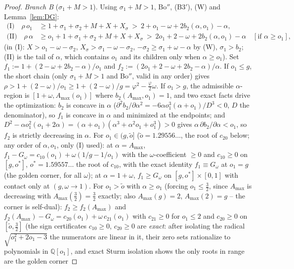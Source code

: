 \documentclass[11pt]{article}
\theoremstyle{definition}
\begin{document}
\begin{proof}
\emph{Branch B} ($\sigma_1+M>1$). Using $\sigma_1+M>1$, Bo$''$, (B3$'$),
(W) and Lemma~\ref{lem:DG}:
\begin{align*}
\text{(I)}\quad
\rho\,o_1&\ge1+\sigma_1+\sigma_2+M+X+X_\sigma
\ >\ 2+o_1-\omega+2b_2(\alpha,o_1)-\alpha,\\
\text{(II)}\quad
\rho\,\alpha&\ge o_1+1+\sigma_1+\sigma_2+M+X+X_\sigma
\ >\ 2o_1+2-\omega+2b_2(\alpha,o_1)-\alpha
\quad[\text{if }\alpha\ge o_1],
\end{align*}
(in (I): $X>o_1-\omega-\sigma_2$, $X_\sigma>\sigma_1-\omega-\sigma_2$,
$-\sigma_2\ge\sigma_1+\omega-\alpha$ by (W), $\sigma_1>b_2$; (II) is the
tail of $\alpha$, which contains $o_1$ and its children only when
$\alpha\ge o_1$). Set $f_1:=1+(2-\omega+2b_2-\alpha)/o_1$ and
$f_2:=(2o_1+2-\omega+2b_2-\alpha)/\alpha$. If $o_1\le g$, the short chain
(only $\sigma_1+M>1$ and Bo$''$, valid in any order) gives
$\rho>1+(2-\omega)/o_1\ge1+(2-\omega)/g=\varphi^2-\tfrac\varphi2\omega$.
If $o_1>g$, the admissible $\alpha$-region is $[1+\omega,A_{\max}(o_1)]$
where $b_2(A_{\max},o_1)=1$, and two exact facts drive the optimization:
$b_2$ is concave in $\alpha$
($\partial^2b_2/\partial\alpha^2=-6\alpha o_1^3(\alpha+o_1)/D^3<0$, $D$
the denominator), so $f_1$ is concave in $\alpha$ and minimized at the
endpoints; and
$D^2-\alpha o_1^2(o_1+2\alpha)=(\alpha+o_1)(\alpha^3+\alpha^2o_1+o_1^3)>0$
gives $\alpha\,\partial b_2/\partial\alpha<o_1$, so $f_2$ is strictly
decreasing in $\alpha$. For $o_1\in(g,\tilde o]$ ($\tilde o=1.29556\dots$,
the root of $c_{20}$ below;
any order of $\alpha,o_1$, only (I) used): at $\alpha=A_{\max}$,
$f_1-G_\omega=c_{10}(o_1)+\omega(1/g-1/o_1)$ with the
$\omega$-coefficient $\ge0$ and $c_{10}\ge0$ on $[g,o^\ast]$,
$o^\ast=1.59557\dots$ the root of $c_{10}$, with
the exact identity $f_1\equiv G_\omega$ at $o_1=g$ (the golden
corner, for all $\omega$); at $\alpha=1+\omega$,
$f_1\ge G_\omega$ on $[g,o^\ast]\times[0,1]$ with contact only at
$(g,\omega\to1)$. For $o_1>\tilde o$ with $\alpha\ge o_1$ (forcing
$o_1\le\tfrac32$, since $A_{\max}$ is decreasing with
$A_{\max}(\tfrac32)=\tfrac32$ exactly; also $A_{\max}(g)=2$,
$A_{\max}(2)=g$ -- the corner is self-dual): $f_2\ge f_2(A_{\max})$ and
$f_2(A_{\max})-G_\omega=c_{20}(o_1)+\omega\,c_{21}(o_1)$ with
$c_{21}\ge0$ for $o_1\le2$ and
$c_{20}\ge0$ on $[\tilde o,\tfrac32]$ (the sign certificates
$c_{10}\ge0$, $c_{20}\ge0$ are \emph{exact}: after isolating the
radical $\sqrt{o_1^2+2o_1-3}$ the numerators are linear in it, their
zero sets rationalize to polynomials in $\mathbb{Q}[o_1]$, and exact
Sturm isolation shows the only roots in range are the golden corner

\end{proof}
\end{document}
